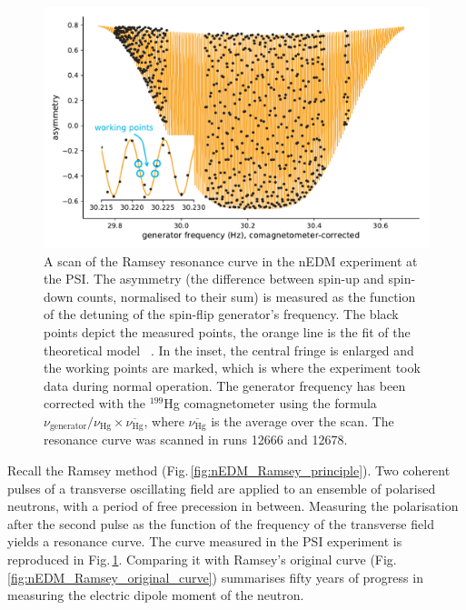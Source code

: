 \begin{figure}
  \centering
  \includegraphics[width=\linewidth]{gfx/nEDMatPSI/ramsey_scan.pdf}
  \caption{A scan of the Ramsey resonance curve in the nEDM experiment at the PSI\@. The asymmetry (the difference between spin-up and spin-down counts, normalised to their sum) is measured as the function of the detuning of the spin-flip generator's frequency. The black points depict the measured points, the orange line is the fit of the theoretical model~\cite{May1998} . In the inset, the central fringe is enlarged and the working points are marked, which is where the experiment took data during normal operation. The generator frequency has been corrected with the $^{199}$Hg comagnetometer using the formula $\nu_\text{generator} / \nu_\text{Hg} \times \overline{\nu_\text{Hg}}$, where $\overline{\nu_\text{Hg}}$ is the average over the scan. The resonance curve was scanned in runs 12666 and 12678.}\label{fig:ramsey_scan}
\end{figure}

Recall the Ramsey method (Fig.\,\ref{fig:nEDM_Ramsey_principle}). Two coherent pulses of a transverse oscillating field are applied to an ensemble of polarised neutrons, with a period of free precession in between. Measuring the polarisation after the second pulse as the function of the frequency of the transverse field yields a resonance curve. The curve measured in the PSI experiment is reproduced in Fig.\,\ref{fig:ramsey_scan}. Comparing it with Ramsey's original curve (Fig.\,\ref{fig:nEDM_Ramsey_original_curve}) summarises fifty years of progress in measuring the electric dipole moment of the neutron.


